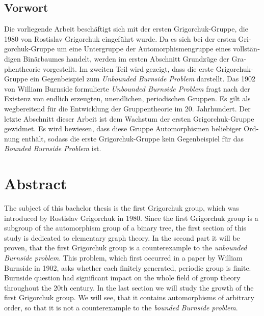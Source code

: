 \newpage

\thispagestyle{empty}

\renewcommand{\thepage}{}

\begin{german}
\section*{Vorwort}
Die vorliegende Arbeit besch\"aftigt sich mit der ersten Grigorchuk-Gruppe, die 1980 von Rostislav Grigorchuk eingef\"uhrt wurde. Da es sich bei der ersten Grigorchuk-Gruppe um eine Untergruppe der Automorphismengruppe eines vollst\"andigen Bin\"arbaumes handelt, werden im ersten Abschnitt Grundz\"uge der Graphentheorie vorgestellt. Im zweiten Teil wird gezeigt, dass die erste Grigorchuk-Gruppe ein Gegenbeispiel zum \emph{Unbounded Burnside Problem} darstellt. Das 1902 von William Burnside formulierte \emph{Unbounded Burnside Problem} fragt nach der Existenz von  endlich erzeugten, unendlichen, periodischen Gruppen. Es gilt als wegbereitend f\"ur die Entwicklung der Gruppentheorie im 20. Jahrhundert. Der letzte Abschnitt dieser Arbeit ist dem Wachstum der ersten Grigorchuk-Gruppe gewidmet. Es wird bewiesen, dass diese Gruppe Automorphismen beliebiger Ordnung enth\"alt, sodass die erste Grigorchuk-Gruppe kein Gegenbeispiel f\"ur das \emph{Bounded Burnside Problem} ist.
\end{german}

\vspace{1.5cm}

\section*{Abstract}
The subject of this bachelor thesis is the first Grigorchuk group, which was introduced by Rostislav Grigorchuk in 1980. Since the first Grigorchuk group is a subgroup of the automorphism group of a binary tree, the first section of this study is dedicated to elementary graph theory. In the second part it will be proven, that the first Grigorchuk group is a counterexample to the \emph{unbounded Burnside problem}. This problem, which first occurred in a paper by William Burnside in 1902, asks whether each finitely generated, periodic group is finite. Burnside question had significant impact on the whole field of group theory throughout the 20th century. In the last section we will study the growth of the first Grigorchuk group. We will see, that it contains automorphisms of arbitrary order, so that it is not a counterexample to the \emph{bounded Burnside problem}.
\newpage
\thispagestyle{empty}
\tableofcontents